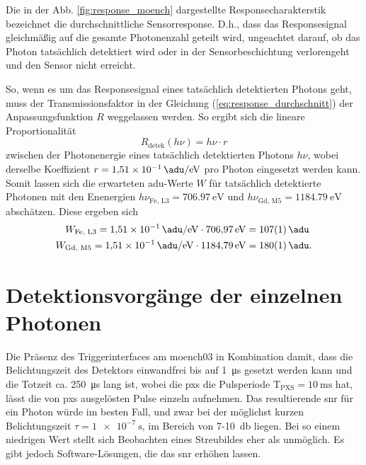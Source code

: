 \noindent
Die in der Abb. \ref{fig:response_moench} dargestellte Responsecharakterstik bezeichnet die durchschnittliche Sensorresponse. D.h., dass das Responsesignal gleichmäßig auf die gesamte Photonenzahl geteilt wird, ungeachtet darauf, ob das Photon tatsächlich detektiert wird oder in der Sensorbeschichtung verlorengeht und den Sensor nicht erreicht.

\noindent
So, wenn es um das Responsesignal eines tatsächlich detektierten Photons geht, muss der Transmissionsfaktor in der Gleichung (\ref{eq:response_durchschnitt}) der Anpassungsfunktion $R$ weggelassen werden. So ergibt sich die lineare Proportionalität
\begin{equation}
    R_\text{detek}(h\nu) = h\nu \cdot r
\end{equation}
zwischen der Photonenergie eines tatsächlich detektierten Photons $h\nu$, wobei derselbe Koeffizient $r = \SI{1.51e-1}{\adu\per\eV}$ pro Photon eingesetzt werden kann. Somit lassen sich die erwarteten \gls{adu}-Werte $W$ für tatsächlich detektierte Photonen mit den Enenergien $h\nu_{\text{Fe, L3}} = \SI{706.97}{\eV}$ und $h\nu_{\text{Gd, M5}} = \SI{1184.79}{\eV}$ abschätzen. Diese ergeben sich 
\begin{equation}
\begin{split}
     W_{\text{Fe, L3}} = \SI{1.51e-1}{\adu\per\eV} \cdot \SI{706.97}{\eV} &=  \SI{107(1)}{\adu}\\
     W_{\text{Gd, M5}} = \SI{1.51e-1}{\adu\per\eV} \cdot \SI{1184.79}{\eV} &=  \SI{180(1)}{\adu}.
\end{split}
\label{eq:auselesewerte_fe_gd}
\end{equation}


\section{Detektionsvorgänge der einzelnen Photonen}
\label{text:single_photon_theorie}
Die Präsenz des Triggerinterfaces am \gls{moench03} in Kombination damit, dass die Belichtungszeit des Detektors einwandfrei bis auf \SI{1}{\micro\second} gesetzt werden kann und die Totzeit ca. \SI{250}{\micro\second} lang ist, wobei die \gls{pxs} die Pulsperiode T$_\text{PXS} = \SI{10}{\milli\second}$ hat, lässt die von \gls{pxs} ausgelösten Pulse einzeln aufnehmen. Das resultierende \gls{snr} für ein Photon würde im besten Fall, und zwar bei der möglichst kurzen Belichtungszeit $\tau = \SI{1e-7}{\second}$, im Bereich von 7-\SI{10}{\decibel} liegen. Bei so einem niedrigen Wert stellt sich Beobachten eines Streubildes eher als unmöglich. Es gibt jedoch Software-Lösungen, die das \gls{snr} erhöhen lassen.  

